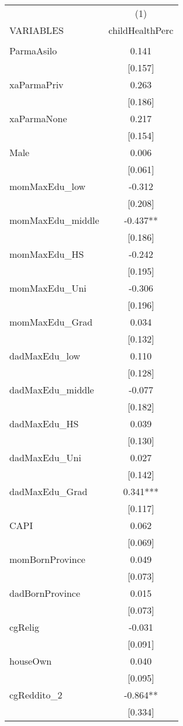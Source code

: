 \documentclass[]{article}
\begin{document}
\begin{tabular}{lc} \hline
 & (1) \\
VARIABLES & childHealthPerc \\ \hline
 &  \\
ParmaAsilo & 0.141 \\
 & [0.157] \\
xaParmaPriv & 0.263 \\
 & [0.186] \\
xaParmaNone & 0.217 \\
 & [0.154] \\
Male & 0.006 \\
 & [0.061] \\
momMaxEdu\_low & -0.312 \\
 & [0.208] \\
momMaxEdu\_middle & -0.437** \\
 & [0.186] \\
momMaxEdu\_HS & -0.242 \\
 & [0.195] \\
momMaxEdu\_Uni & -0.306 \\
 & [0.196] \\
momMaxEdu\_Grad & 0.034 \\
 & [0.132] \\
dadMaxEdu\_low & 0.110 \\
 & [0.128] \\
dadMaxEdu\_middle & -0.077 \\
 & [0.182] \\
dadMaxEdu\_HS & 0.039 \\
 & [0.130] \\
dadMaxEdu\_Uni & 0.027 \\
 & [0.142] \\
dadMaxEdu\_Grad & 0.341*** \\
 & [0.117] \\
CAPI & 0.062 \\
 & [0.069] \\
momBornProvince & 0.049 \\
 & [0.073] \\
dadBornProvince & 0.015 \\
 & [0.073] \\
cgRelig & -0.031 \\
 & [0.091] \\
houseOwn & 0.040 \\
 & [0.095] \\
cgReddito\_2 & -0.864** \\
 & [0.334] \\

\end{tabular}
\end{document}
